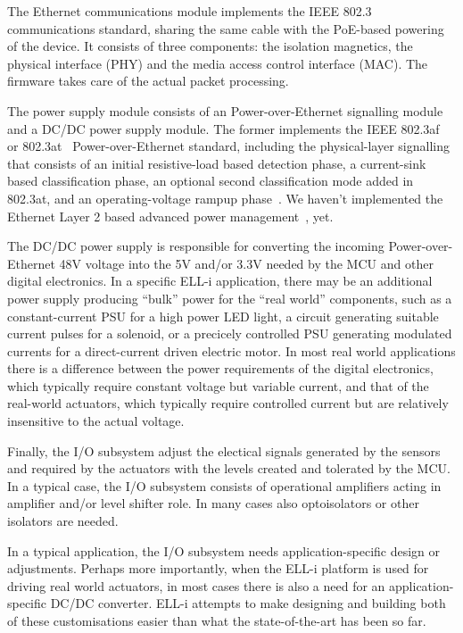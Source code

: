\documentclass[draft,a4paper]{siamltex}
\begin{document}
The Ethernet communications module implements the IEEE 802.3~\cite{802.3}
communications standard, sharing the same cable with the PoE-based
powering of the device.  It consists of three components: the
isolation magnetics, the physical interface (PHY) and the media access
control interface (MAC).  The firmware takes care of the actual packet
processing.

The power supply module consists of an Power-over-Ethernet signalling
module and a DC/DC power supply module.  The former implements the
IEEE 802.3af~\cite{802.3af} or 802.3at~\cite{802.3at}
Power-over-Ethernet standard, including the physical-layer signalling
that consists of an initial resistive-load based detection phase, a
current-sink based classification phase, an optional second
classification mode added in 802.3at, and an operating-voltage rampup
phase~\cite{802.3at}.  We haven't implemented the Ethernet Layer 2
based advanced power management~\cite{802.3at}, yet.

The DC/DC power supply is responsible for converting the incoming
Power-over-Ethernet 48V voltage into the 5V and/or 3.3V needed by the
MCU and other digital electronics.  In a specific ELL-i application,
there may be an additional power supply producing ``bulk'' power for
the ``real world'' components, such as a constant-current PSU for a
high power LED light, a circuit generating suitable current pulses for
a solenoid, or a precicely controlled PSU generating modulated
currents for a direct-current driven electric motor.  In most real
world applications there is a difference between the power
requirements of the digital electronics, which typically require
constant voltage but variable current, and that of the real-world
actuators, which typically require controlled current but are
relatively insensitive to the actual voltage.

Finally, the I/O subsystem adjust the electical signals generated by
the sensors and required by the actuators with the levels created and
tolerated by the MCU.  In a typical case, the I/O subsystem consists
of operational amplifiers acting in amplifier and/or level shifter
role.  In many cases also optoisolators or other isolators are needed.

In a typical application, the I/O subsystem needs application-specific
design or adjustments.  Perhaps more importantly, when the ELL-i
platform is used for driving real world actuators, in most cases there
is also a need for an application-specific DC/DC converter.  ELL-i
attempts to make designing and building both of these customisations
easier than what the state-of-the-art has been so far.
\end{document}
